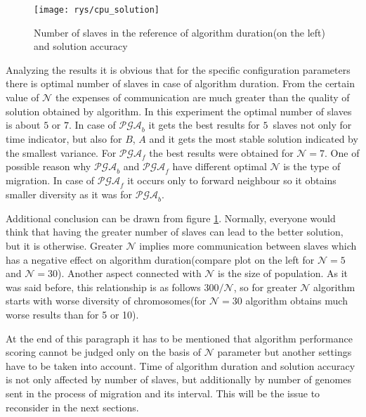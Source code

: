 \begin{figure}[!htpb]
	\begin{center}
		\texttt{[image: rys/cpu\_solution]}
	\end{center}
	\caption{Number of slaves in the reference of algorithm duration(on the left) and solution
	accuracy}
	\label{fig:cpu}
\end{figure}
Analyzing the results it is obvious that for the specific configuration
parameters there is optimal number of slaves in case of algorithm duration. From
the certain value of $\mathcal{N}$ the expenses of communication are much greater 
than the quality of solution obtained by algorithm. In this experiment the optimal 
number of slaves is about $5$ or $7$. In case of $\mathcal{PGA}_b$ it gets the
best results for $5$~slaves not only for time indicator, but also for $B$, $A$
and it gets the most stable solution indicated by the smallest variance. For
$\mathcal{PGA}_f$ the best results were obtained for $\mathcal{N}=7$.
One of possible reason why $\mathcal{PGA}_b$ and $\mathcal{PGA}_f$ have
different optimal $\mathcal{N}$ is the type of migration. In case of $\mathcal{PGA}_f$ 
it occurs only to forward neighbour so it obtains smaller diversity as it was for
$\mathcal{PGA}_b$.


Additional conclusion can be drawn from figure \ref{fig:cpu}. Normally, everyone
would think that having the greater number of slaves can lead to the better
solution, but it is otherwise. Greater $\mathcal{N}$ implies more communication
between slaves which has a negative effect on algorithm duration(compare plot on the left 
for $\mathcal{N}=5$ and $\mathcal{N}=30$). Another aspect connected
with $\mathcal{N}$ is the size of population. As it was said before, this
relationship is as follows $300/\mathcal{N}$, so for greater $\mathcal{N}$
algorithm starts with worse diversity of chromosomes(for $\mathcal{N}=30$
algorithm obtains much worse results than for 5 or 10). 

At the end of this paragraph it has to be mentioned that algorithm performance
scoring cannot be judged only on the basis of $\mathcal{N}$ parameter but another 
settings have to be taken into account. Time of algorithm duration and solution accuracy is not only
affected by number of slaves, but additionally by number of genomes sent in the process of
migration and its interval. This will be the issue to reconsider in the next sections.

